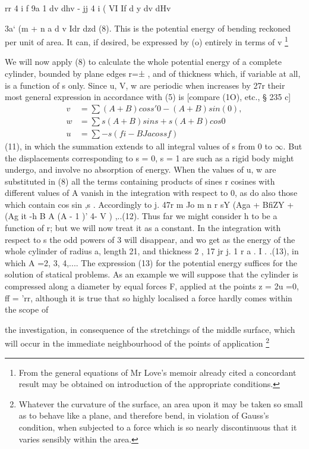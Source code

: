rr 4 i f 9a 1  dv dhv - jj 4 i ( VI If d y dv dHv

3a‘ (m + n a  d v Idr dzd (8).
This is the potential energy of bending reckoned per unit of area. It can, if
desired, be expressed by (o) entirely in terms of v
\footnote{From the general equations of Mr Love's memoir already cited a concordant
result may be obtained on introduction of the appropriate conditions.}

We will now apply (8) to calculate the whole potential energy of a complete
cylinder, bounded by plane edges r=± , and of thickness which, if variable at
all, is a function of s only. Since u, V, w are periodic when  increases by
 27r their most general expression in accordance with (5) is
[compare (1O), etc., § 235 c]
\begin{align}
v &= \sum (A +  B ) cos s'0 - ( A + B)  sin ( 0), \\
w &= \sum  s( A + B) sin s + s (A+B) cos  0 \\
u &= \sum - s (fi - BJa cos sf)
\end{align}
(11), in which the summation extends to all
integral values of s from 0 to \(\infty\). But the displacements corresponding to s
= 0, s = 1 are such as a rigid body might undergo, and involve no absorption
of energy. When the values of u, w are substituted in (8) all the terms
containing products of sines r cosines with different values of A vanish in
the integration with respect to 0, as do also those which contain cos sin ,s .
Accordingly to j. 47r  m Jo m n r sY (Aga + BfiZY + (Ag it -h B A  (A - 1 )'
4- V ) ,..(12).  Thus far we might consider h to be a function of r; but we
will now treat it as a constant. In the integration with respect to s the odd
powers of 3 will disappear, and wo get as the energy of the whole cylinder of
radius a, length 21, and thickness 2 , 17 jr j. 1   r a . I .  .(13), in which
A =2, 3, 4,....  The expression (13) for the potential energy suffices for the
solution of statical problems. As an example we will suppose that the cylinder
is compressed along a diameter by equal forces F, applied at the points z = 2u
=0, ff = 'rr, although it is true that so highly localised a force hardly comes
within the scope of

the investigation, in consequence of the stretchings of the middle surface,
which will occur in the immediate neighbourhood of the points of application
\footnote{
Whatever the curvature of the surface, an area upon
it may be taken so small as to behave like a plane, and therefore bend, in
violation of Gauss's condition, when subjected to a force which is so nearly
discontinuous that it varies sensibly within the area.
}


